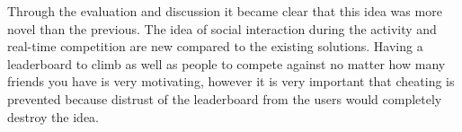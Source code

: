 Through the evaluation and discussion it became clear that this idea was more novel than the previous. The idea of social interaction during the activity and real-time competition are new compared to the existing solutions. Having a leaderboard to climb as well as people to compete against no matter how many friends you have is very motivating, however it is very important that cheating is prevented because distrust of the leaderboard from the users would completely destroy the idea.

